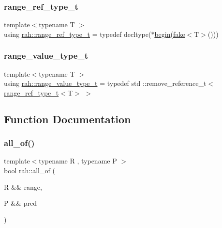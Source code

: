 \mbox{\label{namespacerah_a6622426bea22e9509614fe4c574ebeca}} 
\subsubsection{\texorpdfstring{range\_ref\_type\_t}{range\_ref\_type\_t}}
{\footnotesize\ttfamily template$<$typename T $>$ \\
using \mbox{\hyperlink{namespacerah_a6622426bea22e9509614fe4c574ebeca}{rah\+::range\+\_\+ref\+\_\+type\+\_\+t}} = typedef decltype($\ast$\mbox{\hyperlink{namespacerah_a2c4a19e57cc4e0753e93830f247def6d}{begin}}(\mbox{\hyperlink{namespacerah_a11785bbdf970efa1bc57fc14993b77bf}{fake}}$<$T$>$()))}

\mbox{\label{namespacerah_a0c0c45ea6e732dc2668edfd0e4f8fccf}} 
\subsubsection{\texorpdfstring{range\_value\_type\_t}{range\_value\_type\_t}}
{\footnotesize\ttfamily template$<$typename T $>$ \\
using \mbox{\hyperlink{namespacerah_a0c0c45ea6e732dc2668edfd0e4f8fccf}{rah\+::range\+\_\+value\+\_\+type\+\_\+t}} = typedef std \+::remove\+\_\+reference\+\_\+t$<$\mbox{\hyperlink{namespacerah_a6622426bea22e9509614fe4c574ebeca}{range\+\_\+ref\+\_\+type\+\_\+t}}$<$T$>$ $>$}



\subsection{Function Documentation}
\mbox{\label{namespacerah_aaf7abb6066c8adfe6959691c3a3ea4e2}} 
\subsubsection{\texorpdfstring{all\_of()}{all\_of()}\hspace{0.1cm}{\footnotesize\ttfamily [1/2]}}
{\footnotesize\ttfamily template$<$typename R , typename P $>$ \\
bool rah\+::all\+\_\+of (\begin{DoxyParamCaption}\item[{R \&\&}]{range,  }\item[{P \&\&}]{pred }\end{DoxyParamCaption})}



